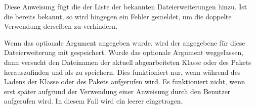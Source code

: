 \begin{Declaration}
\end{Declaration}
Diese Anweisung fügt die  der Liste der bekannten
Dateierweiterungen hinzu. Ist die  bereits bekannt, so
wird hingegen ein Fehler gemeldet, um die doppelte Verwendung derselben
 zu verhindern.

Wenn das optionale Argument  angegeben wurde, wird der
angegebene  für diese Dateierweiterung mit gespeichert. Wurde
das optionale Argument weggelassen, dann versucht  den
Dateinamen der aktuell abgearbeiteten Klasse oder des Pakets herauszufinden
und als  zu speichern. Dies funktioniert
nur, wenn  während des Ladens der Klasse oder des Pakets
aufgerufen wird. Es funktioniert nicht, wenn  erst später
aufgrund der Verwendung einer Anweisung durch den Benutzer aufgerufen wird. In
diesem Fall wird ein leerer  eingetragen. 

